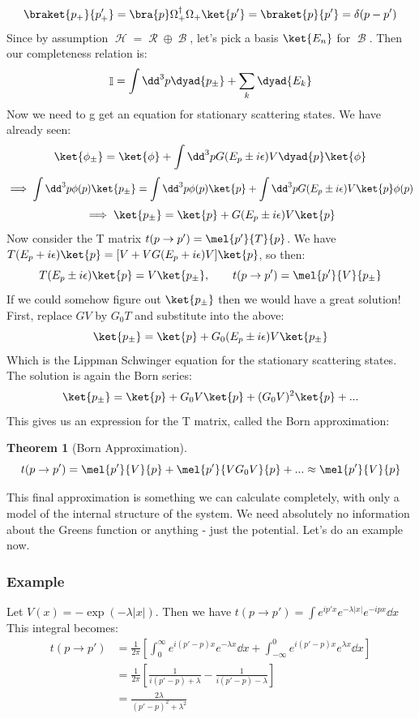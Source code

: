\documentclass{article}
\DeclareMathOperator{\Bb}{\mathcal{B}}
\DeclareMathOperator{\Hh}{{\mathcal{H}}}
\DeclareMathOperator{\Rr}{{\mathcal{R}}}
\DeclareMathOperator{\II}{\mathbb{I}}
\newtheorem{thm}{Theorem}
\begin{document}
\[\braket{p_+}{p'_+} = \bra{p}\Omega^\dagger_+\Omega_+\ket{p'} = \braket{p}{p'} = \delta(p-p')\]
Since by assumption $\Hh = \Rr \oplus \Bb$, let's pick a basis $\ket{E_n}$ for $\Bb$. Then our completeness relation is:
\[\II = \int \dd^3 p \dyad{p_\pm} + \sum_k \dyad{E_k}\]
Now we need to g get an equation for stationary scattering states. We have already seen:
\[\ket{\phi_\pm} = \ket{\phi}+\int \dd^3 p G(E_p\pm i\epsilon) V\dyad{p}\ket{\phi}\]
\[\implies \int \dd^3 p \phi(p)\ket{p_\pm} = \int\dd^3 p \phi(p)\ket{p} + \int \dd^3 p G(E_p \pm i\epsilon)V\ket{p}\phi(p)\]
\[\implies \ket{p_\pm} = \ket{p} + G(E_p\pm i\epsilon) V\ket{p}\]
Now consider the T matrix $t(p\to p') = \mel{p'}{T}{p}$. We have $T(E_p+i\epsilon)\ket{p} = [V+VG(E_p+i\epsilon)V]\ket{p}$, so then:
\begin{equation}T(E_p\pm i\epsilon) \ket{p} = V\ket{p_\pm},\qquad t(p\to p') = \mel{p'}{V}{p_\pm}\end{equation}
If we could somehow figure out $\ket{p_\pm}$ then we would have a great solution! First, replace $GV$ by $G_0 T$ and substitute into the above:
\begin{equation}\ket{p_\pm} = \ket{p} + G_0(E_p\pm i\epsilon)V\ket{p_\pm}\end{equation}
Which is the Lippman Schwinger equation for the stationary scattering states. The solution is again the Born series:
\[\ket{p_\pm} = \ket{p} + G_0 V\ket{p} + (G_0 V)^2 \ket{p} + ...\]
This gives us an expression for the T matrix, called the Born approximation:
\begin{thm}[Born Approximation]
\begin{equation}t(p\to p') = \mel{p'}{V}{p}+\mel{p'}{V G_0 V}{p} + ... \approx \mel{p'}{V}{p}\end{equation}
\end{thm}
This final approximation is something we can calculate completely, with only a model of the internal structure of the system. We need absolutely no information about the Greens function or anything - just the potential. Let's do an example now.

\subsubsection*{Example}
Let $V(x) = -\exp(-\lambda |x|)$. Then we have $t(p\to p') = \int e^{ip'x}e^{-\lambda |x|}e^{-ipx}\dd x$ This integral becomes:
\begin{align*}t(p\to p')&=\frac{1}{2\pi}\left[\int_0^\infty e^{i(p'-p)x} e^{-\lambda x}\dd x + \int_{-\infty}^0 e^{i(p'-p)x}e^{\lambda x} \dd x\right]\\
&= \frac{1}{2\pi}\left[\frac{1}{i(p'-p)+\lambda}-\frac{1}{i(p'-p)-\lambda}\right]\\
&= \frac{2\lambda}{(p'-p)^2+\lambda^2}\end{align*}

\pagebreak



\nocite{*}
\printbibliography
\end{document}
